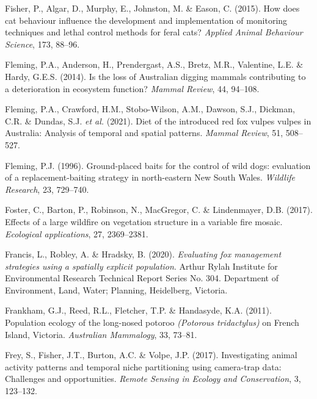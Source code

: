 \documentclass[11pt,a4paper,titlepage,twoside,openright]{style/unimelbthesis}
\begin{document}
\begin{mainmatter}
\leavevmode\hypertarget{ref-fisher2015cat}{}%
Fisher, P., Algar, D., Murphy, E., Johnston, M. \& Eason, C. (2015). How does cat behaviour influence the development and implementation of monitoring techniques and lethal control methods for feral cats? \emph{Applied Animal Behaviour Science}, 173, 88--96.

\leavevmode\hypertarget{ref-fleming2014loss}{}%
Fleming, P.A., Anderson, H., Prendergast, A.S., Bretz, M.R., Valentine, L.E. \& Hardy, G.E.S. (2014). Is the loss of Australian digging mammals contributing to a deterioration in ecosystem function? \emph{Mammal Review}, 44, 94--108.

\leavevmode\hypertarget{ref-fleming2021diet}{}%
Fleming, P.A., Crawford, H.M., Stobo-Wilson, A.M., Dawson, S.J., Dickman, C.R. \& Dundas, S.J. \emph{et al.} (2021). Diet of the introduced red fox vulpes vulpes in Australia: Analysis of temporal and spatial patterns. \emph{Mammal Review}, 51, 508--527.

\leavevmode\hypertarget{ref-fleming1996ground}{}%
Fleming, P.J. (1996). Ground-placed baits for the control of wild dogs: evaluation of a replacement-baiting strategy in north-eastern New South Wales. \emph{Wildlife Research}, 23, 729--740.

\leavevmode\hypertarget{ref-foster2017effects}{}%
Foster, C., Barton, P., Robinson, N., MacGregor, C. \& Lindenmayer, D.B. (2017). Effects of a large wildfire on vegetation structure in a variable fire mosaic. \emph{Ecological applications}, 27, 2369--2381.

\leavevmode\hypertarget{ref-francis2020evaluating}{}%
Francis, L., Robley, A. \& Hradsky, B. (2020). \emph{Evaluating fox management strategies using a spatially explicit population}. Arthur Rylah Institute for Environmental Research Technical Report Series No. 304. Department of Environment, Land, Water; Planning, Heidelberg, Victoria.

\leavevmode\hypertarget{ref-frankham2011population}{}%
Frankham, G.J., Reed, R.L., Fletcher, T.P. \& Handasyde, K.A. (2011). Population ecology of the long-nosed potoroo \emph{(Potorous tridactylus)} on French Island, Victoria. \emph{Australian Mammalogy}, 33, 73--81.

\leavevmode\hypertarget{ref-frey2017investigating}{}%
Frey, S., Fisher, J.T., Burton, A.C. \& Volpe, J.P. (2017). Investigating animal activity patterns and temporal niche partitioning using camera-trap data: Challenges and opportunities. \emph{Remote Sensing in Ecology and Conservation}, 3, 123--132.


\end{mainmatter}
\end{document}
